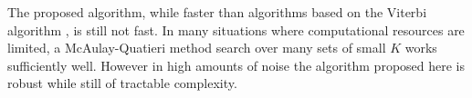 \documentclass{article}
\begin{document}
\begin{sloppy}
The proposed algorithm, while faster than algorithms based on the Viterbi
algorithm \cite{wolf1989finding}, is still not fast. In many situations where computational resources are
limited, a McAulay-Quatieri method search over many sets of small $K$ works
sufficiently well. However in high amounts of noise the algorithm proposed here
is robust while still of tractable complexity.





\end{sloppy}
\end{document}
